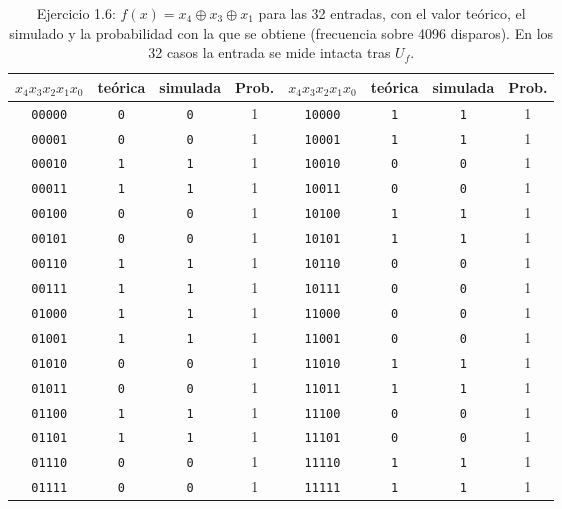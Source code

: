 \begin{table}[htbp]
    \centering
{\small\setlength{\tabcolsep}{4pt}
\begin{tabular}{c|c|c|c||c|c|c|c}
\hline
$x_4x_3x_2x_1x_0$ & teórica & simulada & Prob. & $x_4x_3x_2x_1x_0$ & teórica & simulada & Prob. \\
\hline
\texttt{00000} & \texttt{0} & \texttt{0} & 1 & \texttt{10000} & \texttt{1} & \texttt{1} & 1 \\
\texttt{00001} & \texttt{0} & \texttt{0} & 1 & \texttt{10001} & \texttt{1} & \texttt{1} & 1 \\
\texttt{00010} & \texttt{1} & \texttt{1} & 1 & \texttt{10010} & \texttt{0} & \texttt{0} & 1 \\
\texttt{00011} & \texttt{1} & \texttt{1} & 1 & \texttt{10011} & \texttt{0} & \texttt{0} & 1 \\
\texttt{00100} & \texttt{0} & \texttt{0} & 1 & \texttt{10100} & \texttt{1} & \texttt{1} & 1 \\
\texttt{00101} & \texttt{0} & \texttt{0} & 1 & \texttt{10101} & \texttt{1} & \texttt{1} & 1 \\
\texttt{00110} & \texttt{1} & \texttt{1} & 1 & \texttt{10110} & \texttt{0} & \texttt{0} & 1 \\
\texttt{00111} & \texttt{1} & \texttt{1} & 1 & \texttt{10111} & \texttt{0} & \texttt{0} & 1 \\
\texttt{01000} & \texttt{1} & \texttt{1} & 1 & \texttt{11000} & \texttt{0} & \texttt{0} & 1 \\
\texttt{01001} & \texttt{1} & \texttt{1} & 1 & \texttt{11001} & \texttt{0} & \texttt{0} & 1 \\
\texttt{01010} & \texttt{0} & \texttt{0} & 1 & \texttt{11010} & \texttt{1} & \texttt{1} & 1 \\
\texttt{01011} & \texttt{0} & \texttt{0} & 1 & \texttt{11011} & \texttt{1} & \texttt{1} & 1 \\
\texttt{01100} & \texttt{1} & \texttt{1} & 1 & \texttt{11100} & \texttt{0} & \texttt{0} & 1 \\
\texttt{01101} & \texttt{1} & \texttt{1} & 1 & \texttt{11101} & \texttt{0} & \texttt{0} & 1 \\
\texttt{01110} & \texttt{0} & \texttt{0} & 1 & \texttt{11110} & \texttt{1} & \texttt{1} & 1 \\
\texttt{01111} & \texttt{0} & \texttt{0} & 1 & \texttt{11111} & \texttt{1} & \texttt{1} & 1 \\
\hline
\end{tabular}}
    \caption{Ejercicio 1.6: $f(x)=x_4\oplus x_3\oplus x_1$ para las 32 entradas, con el valor teórico, el simulado y la probabilidad con la que se obtiene
    (frecuencia sobre 4096 disparos). En los 32 casos la entrada se mide intacta tras $U_f$.}\label{tab:bloque1_e1_6}
\end{table}


